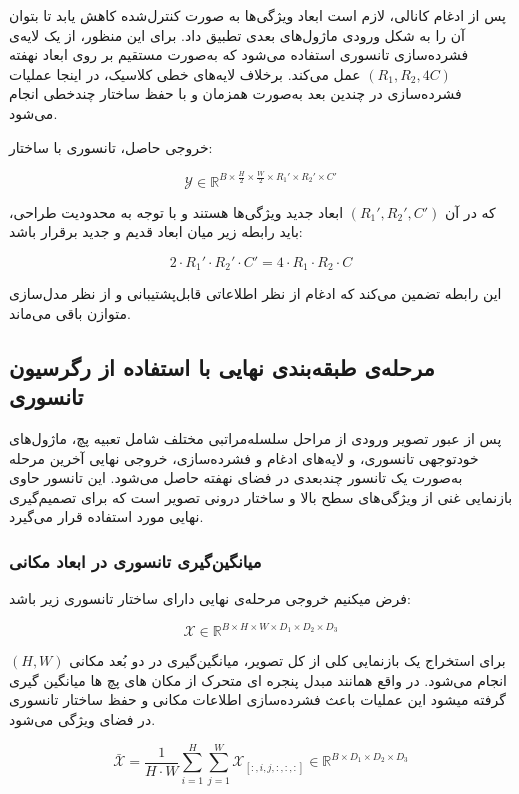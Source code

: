 پس از ادغام کانالی، لازم است ابعاد ویژگی‌ها به صورت کنترل‌شده کاهش یابد تا بتوان آن را به شکل ورودی ماژول‌های بعدی تطبیق داد. برای این منظور، از یک لایه‌ی فشرده‌سازی تانسوری استفاده می‌شود که به‌صورت مستقیم بر روی ابعاد نهفته $(R_1, R_2, 4C)$ عمل می‌کند. برخلاف لایه‌های خطی کلاسیک، در اینجا عملیات فشرده‌سازی در چندین بعد به‌صورت همزمان و با حفظ ساختار چندخطی انجام می‌شود.

خروجی حاصل، تانسوری با ساختار:

\[
\mathcal{Y} \in \mathbb{R}^{B \times \frac{H}{2} \times \frac{W}{2} \times R_1' \times R_2' \times C'}
\]

که در آن $(R_1', R_2', C')$ ابعاد جدید ویژگی‌ها هستند و با توجه به محدودیت طراحی، باید رابطه زیر میان ابعاد قدیم و جدید برقرار باشد:

\[
2 \cdot R_1' \cdot R_2' \cdot C' = 4 \cdot R_1 \cdot R_2 \cdot C
\]

این رابطه تضمین می‌کند که ادغام از نظر اطلاعاتی قابل‌پشتیبانی و از نظر مدل‌سازی متوازن باقی می‌ماند.



\subsection{مرحله‌ی طبقه‌بندی نهایی با استفاده از رگرسیون تانسوری}

پس از عبور تصویر ورودی از مراحل سلسله‌مراتبی مختلف شامل تعبیه پچ، ماژول‌های خودتوجهی تانسوری، و لایه‌های ادغام و فشرده‌سازی، خروجی نهایی آخرین مرحله به‌صورت یک تانسور چندبعدی در فضای نهفته حاصل می‌شود. این تانسور حاوی بازنمایی غنی از ویژگی‌های سطح بالا و ساختار درونی تصویر است که برای تصمیم‌گیری نهایی مورد استفاده قرار می‌گیرد.

\subsubsection*{میانگین‌گیری تانسوری در ابعاد مکانی}

فرض میکنیم خروجی مرحله‌ی نهایی دارای ساختار تانسوری زیر باشد:

\[
\mathcal{X} \in \mathbb{R}^{B \times H \times W \times D_1 \times D_2 \times D_3}
\]


برای استخراج یک بازنمایی کلی از کل تصویر، میانگین‌گیری در دو بُعد مکانی $(H, W)$ انجام می‌شود. 
در واقع همانند مبدل پنجره ای متحرک از مکان های پچ ها میانگین گیری گرفته میشود 
این عملیات باعث فشرده‌سازی اطلاعات مکانی و حفظ ساختار تانسوری در فضای ویژگی می‌شود.

\[
\bar{\mathcal{X}} = \frac{1}{H \cdot W} \sum_{i=1}^{H} \sum_{j=1}^{W} \mathcal{X}_{[:, i, j, :, :, :]} \in \mathbb{R}^{B \times D_1 \times D_2 \times D_3}
\]

